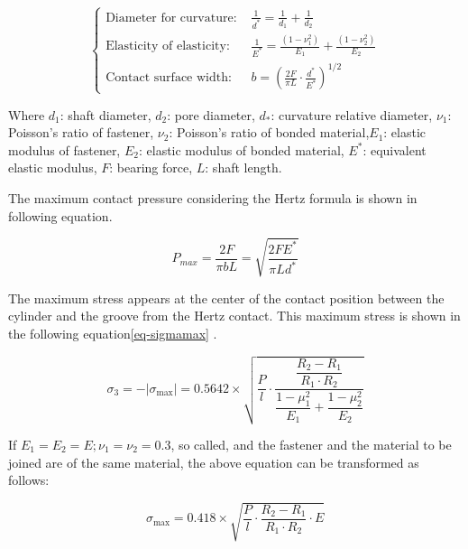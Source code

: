 \begin{equation}
\begin{cases}
\text{Diameter for curvature: } &\frac{1}{d^*} = \frac{1}{d_1} +\frac{1}{d_2} \\

\text{Elasticity of elasticity: } &\frac{1}{E^*} = \frac{(1-\nu_1^2)}{E_1}+\frac{(1-\nu_2^2)}{E_2} \\

\text{Contact surface width: } & b=  (\frac{2F}{\pi L} \cdot \frac{d^*}{E^*})^{1/2}

\end{cases}  
\label{eq.hertz1}
\end{equation}

Where $d_1$: shaft diameter, $d_2$: pore diameter, $d_*$: curvature relative diameter, $\nu_1$: Poisson's ratio of fastener, $\nu_2$: Poisson's ratio of bonded material,$E_1$: elastic modulus of fastener, $E_2$: elastic modulus of bonded material, $E^*$: equivalent elastic modulus, $F$: bearing force, $L$: shaft length. \par

The maximum contact pressure considering the Hertz formula is shown in following equation.

\begin{equation}
   P_{max} = \dfrac{2F}{\pi b L} = \sqrt{\dfrac{2FE^*}{\pi Ld^*}}
\end{equation}


The maximum stress appears at the center of the contact position between the cylinder and the groove from the Hertz contact. This maximum stress is shown in the following equation\ref{eq-sigmamax} \cite{g1979AideMemoire}.

\begin{equation}
    \sigma_{3}=-\left|\sigma_{\max }\right|=0.5642 \times \sqrt{\dfrac{P}{l} \cdot \dfrac{\dfrac{R_{2}-R_{1}}{R_{1} \cdot R_{2}}}{\dfrac{1-\mu_{1}^{2}}{E_{1}}+\dfrac{1-\mu_{2}^{2}}{E_{2}}}}
    \label{eq-sigmamax}
\end{equation}

If $E_1 = E_2 = E ; \nu_1 = \nu_2 = 0.3$, so called, and the fastener and the material to be joined are of the same material, the above equation can be transformed as follows:

\begin{equation}
    \sigma_{\max }=0.418 \times \sqrt{\dfrac{P}{l} \cdot \dfrac{R_{2}-R_{1}}{R_{1} \cdot R_{2}} \cdot E}
    \label{eq-sigmamax2}
\end{equation}

